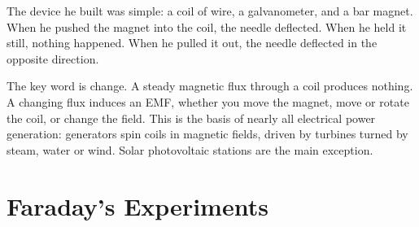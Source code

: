 The device he built was simple: a coil of wire, a
galvanometer, and a bar magnet. When he pushed the
magnet into the coil, the needle deflected. When he
held it still, nothing happened. When he pulled it
out, the needle deflected in the opposite direction.

The key word is change. A steady magnetic flux through a coil
produces nothing. A changing flux induces an EMF, whether you move
the magnet, move or rotate the coil, or change the field. This is the
basis of nearly all electrical power generation: generators spin
coils in magnetic fields, driven by turbines turned by steam, water
or wind. Solar photovoltaic stations are the main exception.

\section{Faraday's Experiments}

